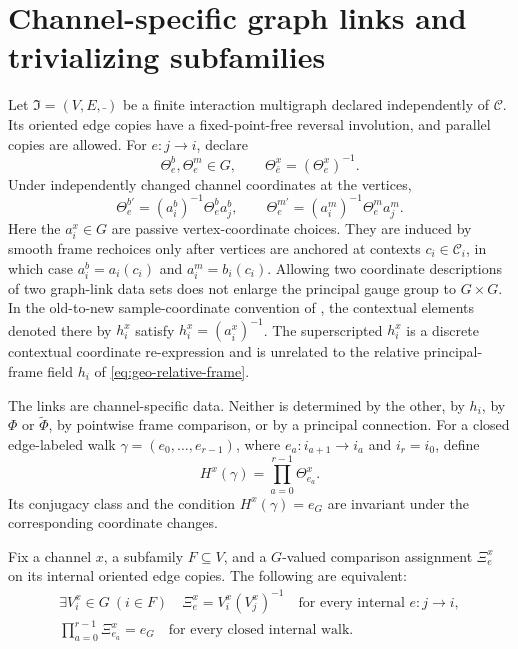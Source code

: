 \section{Channel-specific graph links and trivializing subfamilies}
\label{sec:geo-regime-two}
\label{sec:geo-trivializing}

Let $\mathfrak I=(V,E,\bar{\ })$ be a finite interaction multigraph declared independently of
$\mathcal C$.  Its oriented edge copies have a fixed-point-free reversal involution, and parallel
copies are allowed.  For $e:j\to i$, declare
\begin{equation}
\Theta_e^b,\Theta_e^m\in G,
\qquad
\Theta_{\bar e}^x=(\Theta_e^x)^{-1}.
\label{eq:geo-regime-two-links}
\end{equation}
Under independently changed channel coordinates at the vertices,
\begin{equation}
\Theta_e^{b\prime}=(a_i^b)^{-1}\Theta_e^b a_j^b,
\qquad
\Theta_e^{m\prime}=(a_i^m)^{-1}\Theta_e^m a_j^m.
\label{eq:geo-regime-two-gauge-law}
\end{equation}
Here the $a_i^x\in G$ are passive vertex-coordinate choices.  They are induced by smooth frame
rechoices only after vertices are anchored at contexts $c_i\in\mathcal C_i$, in which case
$a_i^b=a_i(c_i)$ and $a_i^m=b_i(c_i)$.  Allowing two coordinate descriptions of two graph-link
data sets does not enlarge the principal gauge group to $G\times G$.  In the old-to-new
sample-coordinate convention of , the contextual elements denoted there by
$h_i^x$ satisfy $h_i^x=(a_i^x)^{-1}$.  The superscripted $h_i^x$ is a discrete contextual
coordinate re-expression and is unrelated to the relative principal-frame field $h_i$ of
\eqref{eq:geo-relative-frame}. 

The links are channel-specific data.  Neither is determined by the other, by $h_i$, by $\Phi$ or
$\widetilde\Phi$, by pointwise frame comparison, or by a principal connection.  For a closed
edge-labeled walk $\gamma=(e_0,\ldots,e_{r-1})$, where $e_a:i_{a+1}\to i_a$ and $i_r=i_0$, define
\begin{equation}
H^x(\gamma)=\prod_{a=0}^{r-1}\Theta_{e_a}^x.
\label{eq:geo-link-holonomy}
\end{equation}
Its conjugacy class and the condition $H^x(\gamma)=e_G$ are invariant under the corresponding
coordinate changes. 

Fix a channel $x$, a subfamily $F\subseteq V$, and a $G$-valued comparison assignment $\Xi_e^x$
on its internal oriented edge copies.  The following are equivalent:
\begin{equation}
\begin{gathered}
\exists V_i^x\in G\ (i\in F)
\quad
\Xi_e^x=V_i^x(V_j^x)^{-1}
\quad\text{for every internal }e:j\to i,\\
\prod_{a=0}^{r-1}\Xi_{e_a}^x=e_G
\quad\text{for every closed internal walk}.
\end{gathered}
\label{eq:geo-trivializing-criterion}
\end{equation}


